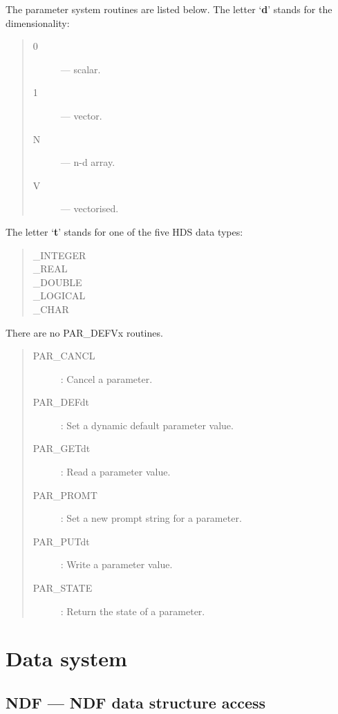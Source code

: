 The parameter system routines are listed below.
The letter `{\bf d}' stands for the dimensionality:
\begin{quote}
\begin{description}
\item [0] --- scalar.
\item [1] --- vector.
\item [N] --- n-d array.
\item [V] --- vectorised.
\end{description}
\end{quote}
The letter `{\bf t}' stands for one of the five HDS data types:
\begin{quote}
\begin{description}
\item [\_INTEGER]
\item [\_REAL]
\item [\_DOUBLE]
\item [\_LOGICAL]
\item [\_CHAR]
\end{description}
\end{quote}
There are no PAR\_DEFVx routines.
\begin{quote}
\begin{description}
\item [PAR\_CANCL] : Cancel a parameter.
\item [PAR\_DEFdt] : Set a dynamic default parameter value.
\item [PAR\_GETdt] : Read a parameter value.
\item [PAR\_PROMT] : Set a new prompt string for a parameter.
\item [PAR\_PUTdt] : Write a parameter value.
\item [PAR\_STATE] : Return the state of a parameter.
\end{description}
\end{quote}

\newpage

\section{Data system}

\subsection{NDF --- NDF data structure access}
\label{R_NDF}

\vspace{-9mm}

